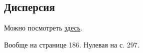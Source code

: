 \subsection{Дисперсия}


Можно посмотреть \href{http://foos.sfedu.ru/glava2/2.2.html}{здесь}.

Вообще на странице 186. Нулевая на с. 297. 



